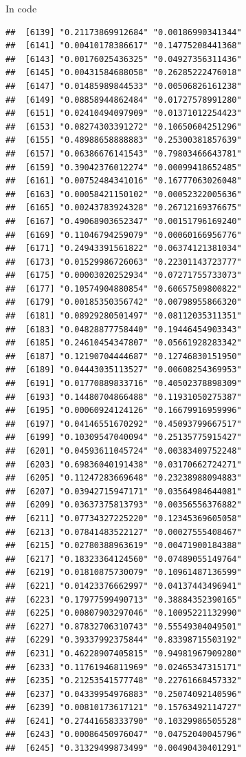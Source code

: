 \documentclass[ignorenonframetext,]{beamer}
\begin{document}
\begin{frame}[fragile]{In code}
\begin{verbatim}
##  [6139] "0.21173869912684" "0.00186990341344"
##  [6141] "0.00410178386617" "0.14775208441368"
##  [6143] "0.00176025436325" "0.04927356311436"
##  [6145] "0.00431584688058" "0.26285222476018"
##  [6147] "0.01485989844533" "0.00506826161238"
##  [6149] "0.08858944862484" "0.01727578991280"
##  [6151] "0.02410494097909" "0.01371012254423"
##  [6153] "0.08274303391272" "0.10650604251296"
##  [6155] "0.48988658888883" "0.25300381857639"
##  [6157] "0.06386676141543" "0.79803466643781"
##  [6159] "0.39042376012274" "0.00099418652485"
##  [6161] "0.00752484341016" "0.16777063026048"
##  [6163] "0.00058421150102" "0.00052322005636"
##  [6165] "0.00243783924328" "0.26712169376675"
##  [6167] "0.49068903652347" "0.00151796169240"
##  [6169] "0.11046794259079" "0.00060166956776"
##  [6171] "0.24943391561822" "0.06374121381034"
##  [6173] "0.01529986726063" "0.22301143723777"
##  [6175] "0.00003020252934" "0.07271755733073"
##  [6177] "0.10574904880854" "0.60657509800822"
##  [6179] "0.00185350356742" "0.00798955866320"
##  [6181] "0.08929280501497" "0.08112035311351"
##  [6183] "0.04828877758440" "0.19446454903343"
##  [6185] "0.24610454347807" "0.05661928283342"
##  [6187] "0.12190704444687" "0.12746830151950"
##  [6189] "0.04443035113527" "0.00608254369953"
##  [6191] "0.01770889833716" "0.40502378898309"
##  [6193] "0.14480704866488" "0.11931050275387"
##  [6195] "0.00060924124126" "0.16679916959996"
##  [6197] "0.04146551670292" "0.45093799667517"
##  [6199] "0.10309547040094" "0.25135775915427"
##  [6201] "0.04593611045724" "0.00383409752248"
##  [6203] "0.69836040191438" "0.03170662724271"
##  [6205] "0.11247283669648" "0.23238988094883"
##  [6207] "0.03942715947171" "0.03564984644081"
##  [6209] "0.03637375813793" "0.00356556376882"
##  [6211] "0.07734327225220" "0.12345369605058"
##  [6213] "0.07841483522127" "0.00027555408467"
##  [6215] "0.02780388963619" "0.00471900184388"
##  [6217] "0.18323364124560" "0.07489055149764"
##  [6219] "0.01810875730079" "0.10961487136599"
##  [6221] "0.01423376662997" "0.04137443496941"
##  [6223] "0.17977599490713" "0.38884352390165"
##  [6225] "0.00807903297046" "0.10095221132990"
##  [6227] "0.87832706310743" "0.55549304049501"
##  [6229] "0.39337992375844" "0.83398715503192"
##  [6231] "0.46228907405815" "0.94981967909280"
##  [6233] "0.11761946811969" "0.02465347315171"
##  [6235] "0.21253541577748" "0.22761668457332"
##  [6237] "0.04339954976883" "0.25074092140596"
##  [6239] "0.00810173617121" "0.15763492114727"
##  [6241] "0.27441658333790" "0.10329986505528"
##  [6243] "0.00086450976047" "0.04752040045796"
##  [6245] "0.31329499873499" "0.00490430401291"

\end{verbatim}
\end{frame}
\end{document}
